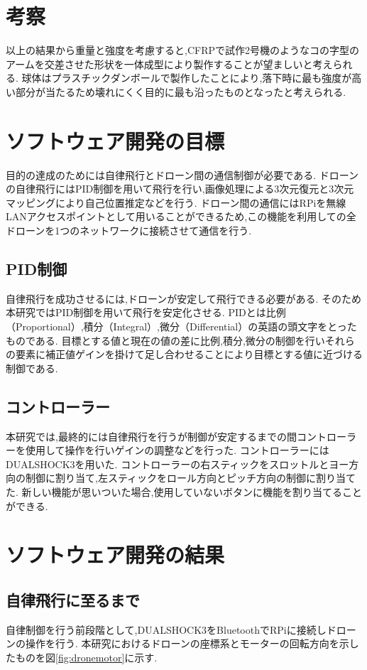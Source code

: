 \documentclass[a4paper]{jarticle}
\begin{document}
\section{考察}
以上の結果から重量と強度を考慮すると,CFRPで試作2号機のようなコの字型のアームを交差させた形状を一体成型により製作することが望ましいと考えられる.
球体はプラスチックダンボールで製作したことにより,落下時に最も強度が高い部分が当たるため壊れにくく目的に最も沿ったものとなったと考えられる.


\section{ソフトウェア開発の目標}
目的の達成のためには自律飛行とドローン間の通信制御が必要である.
ドローンの自律飛行にはPID制御を用いて飛行を行い,画像処理による3次元復元と3次元マッピングにより自己位置推定などを行う.
ドローン間の通信にはRPiを無線LANアクセスポイントとして用いることができるため,この機能を利用しての全ドローンを1つのネットワークに接続させて通信を行う.

\subsection{PID制御}
自律飛行を成功させるには,ドローンが安定して飛行できる必要がある.
そのため本研究ではPID制御を用いて飛行を安定化させる.
PIDとは比例（Proportional）,積分（Integral）,微分（Differential）の英語の頭文字をとったものである.
目標とする値と現在の値の差に比例,積分,微分の制御を行いそれらの要素に補正値ゲインを掛けて足し合わせることにより目標とする値に近づける制御である.

\subsection{コントローラー}
本研究では,最終的には自律飛行を行うが制御が安定するまでの間コントローラーを使用して操作を行いゲインの調整などを行った.
コントローラーにはDUALSHOCK3を用いた.
コントローラーの右スティックをスロットルとヨー方向の制御に割り当て,左スティックをロール方向とピッチ方向の制御に割り当てた.
新しい機能が思いついた場合,使用していないボタンに機能を割り当てることができる.


\section{ソフトウェア開発の結果}

\subsection{自律飛行に至るまで}
自律制御を行う前段階として,DUALSHOCK3をBluetoothでRPiに接続しドローンの操作を行う.
本研究におけるドローンの座標系とモーターの回転方向を示したものを図\ref{fig:dronemotor}に示す.
\end{document}
